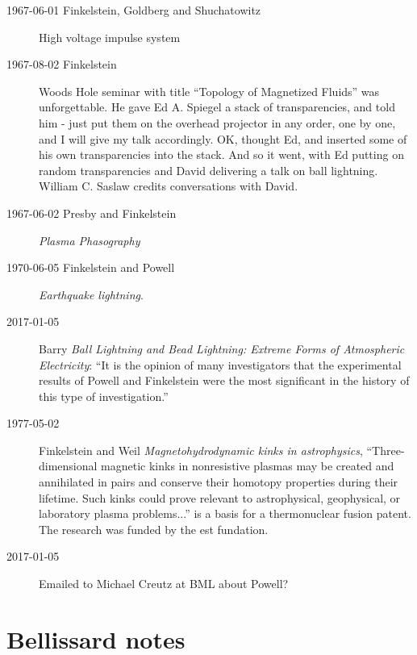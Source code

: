 \begin{description}
\item[1967-06-01 Finkelstein, Goldberg and  Shuchatowitz]
 {High voltage impulse system}

\item[1967-08-02 Finkelstein]
Woods Hole seminar with title ``Topology of Magnetized Fluids'' was
unforgettable. He gave Ed A. Spiegel a stack of transparencies, and told
him - just put them on the overhead projector in any order, one by one,
and I will give my talk accordingly. OK, thought Ed, and inserted some of
his own transparencies into the stack. And so it went, with Ed putting on
random transparencies and David delivering a talk on ball lightning.
{William C. Saslaw} credits
{conversations} with David.

\item[1967-06-02 Presby and Finkelstein]
{\em Plasma Phasography}

\item[1970-06-05 Finkelstein and Powell]
{\em Earthquake lightning}.

\item[2017-01-05]
Barry {\em Ball Lightning and Bead Lightning: Extreme Forms
of Atmospheric Electricity}: ``It is the opinion of many
investigators that the experimental results of Powell and
Finkelstein were the most significant in the
history of this type of investigation.''

\item[1977-05-02]
Finkelstein and Weil
{\em Magnetohydrodynamic kinks in astrophysics},
``Three-dimensional magnetic kinks in nonresistive plasmas may be created
and annihilated in pairs and conserve their homotopy properties during
their lifetime. Such kinks could prove relevant to astrophysical,
geophysical, or laboratory plasma problems...'' is a basis for a
thermonuclear fusion patent. The research was funded by the est fundation.

\item[2017-01-05]
Emailed to Michael Creutz at BML about Powell?


\end{description}



\section{Bellissard notes}
\label{sect:Bellissard}

